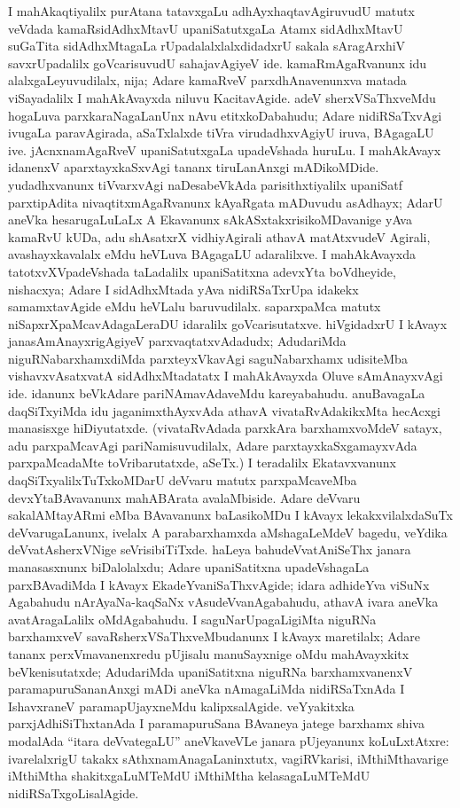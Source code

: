 I mahAkaqtiyalilx purAtana tatavxgaLu adhAyxhaqtavAgiruvudU matutx veVdada kamaRsidAdhxMtavU upaniSatutxgaLa Atamx sidAdhxMtavU suGaTita sidAdhxMtagaLa rUpa\-dalalxlalxdidadxrU sakala sAragArxhiV savxrUpadalilx goVcarisuvudU sahajavAgiyeV ide. kamaRmAgaRvanunx idu alalxgaLeyuvudilalx, nija; Adare kamaRveV parxdhAnavenunxva matada viSayadalilx I mahAkAvayxda niluvu KacitavAgide. adeV sherxVSaThxveMdu hogaLuva parxkaraNagaLanUnx nAvu etitxkoDabahudu; Adare nidiRSaTxvAgi ivugaLa paravAgirada, aSaTxlalxde tiVra virudadhxvAgiyU iruva, BAgagaLU ive. jAcnxnamAgaRveV upaniSatutxgaLa upadeVshada huruLu. I mahAkAvayx idanenxV aparxtayxkaSxvAgi tananx tiruLanAnxgi mADikoMDide. yudadhxvanunx tiVvarxvAgi naDesabeVkAda parisithxtiyalilx upaniSatf parxtipAdita nivaqtitxmAgaRvanunx kAyaRgata mADuvudu asAdhayx; AdarU aneVka hesarugaLuLaLx A Ekavanunx sAkASxtakxrisikoMDavanige yAva kamaRvU kUDa, adu shAsatxrX vidhiyAgirali athavA matAtxvudeV Agirali, avashayxkavalalx eMdu heVLuva BAgagaLU adaralilxve. I mahAkAvayxda tatotxvXVpadeVshada taLadalilx upaniSatitxna adevxYta boVdheyide, nishacxya; Adare I sidAdhxMtada yAva nidiRSaTxrUpa idakekx samamxtavAgide eMdu heVLalu baruvudilalx. saparxpaMca matutx niSapxrXpaMcavAdagaLeraDU idaralilx goVcarisutatxve. hiVgidadxrU I kAvayx janasAmAnayxrigAgiyeV parxvaqtatxvAdadudx; AdudariMda niguRNabarxhamxdiMda parxteyxVkavAgi saguNabarxhamx udisiteMba vishavxvAsatxvatA sidAdhxMtadatatx I mahAkAvayxda Oluve sAmAnayxvAgi ide. idanunx beVkAdare pariNAmavAdaveMdu kareyabahudu. anuBavagaLa daqSiTxyiMda idu jaganimxthAyxvAda athavA vivataRvAdakikxMta hecAcxgi manasisxge hiDiyutatxde. (vivataRvAdada parxkAra barxhamxvoMdeV satayx, adu parxpaMcavAgi pariNamisuvudilalx, Adare parxtayxkaSxgamayxvAda parxpaMcadaMte toVribarutatxde, aSeTx.) I teradalilx Ekatavxvanunx daqSiTxyalilxTuTxkoMDarU deVvaru matutx parxpaMcaveMba devxYtaBAvavanunx mahABArata avalaMbiside. Adare deVvaru sakalAMtayARmi eMba BAvavanunx baLasikoMDu I kAvayx lekakxvilalxdaSuTx deVvarugaLanunx, ivelalx A parabarxhamxda aMshagaLeMdeV bagedu, veYdika deVvatAsherxVNige seVrisibiTiTxde. haLeya bahudeVvatAniSeThx janara manasasxnunx biDalolalxdu; Adare upaniSatitxna upadeVshagaLa parxBAvadiMda I kAvayx EkadeYvaniSaThxvAgide; idara adhideYva viSuNx Agabahudu nArAyaNa-kaqSaNx vAsudeVvanAgabahudu, athavA ivara aneVka avatAragaLalilx oMdAgabahudu. I saguNarUpagaLigiMta niguRNa barxhamxveV savaRsherxVSaThxveMbudanunx I kAvayx maretilalx; Adare tananx perxVmavanenxredu pUjisalu manuSayxnige oMdu mahAvayxkitx beVkenisutatxde; AdudariMda upaniSatitxna niguRNa barxhamxvanenxV paramapuruSananAnxgi mADi aneVka nAmagaLiMda nidiRSaTxnAda I IshavxraneV paramapUjayxneMdu kalipxsalAgide. veYyakitxka parxjAdhiSiThxtanAda I paramapuruSana BAvaneya jatege barxhamx shiva modalAda ``itara deVvategaLU'' aneVkaveVLe janara pUjeyanunx koLuLxtAtxre: ivarelalxrigU takakx sAthxnamAnagaLaninxtutx, vagiRVkarisi, iMthiMthavarige iMthiMtha shakitxgaLuMTeMdU iMthiMtha kelasagaLuMTeMdU nidiRSaTxgoLisalAgide.

